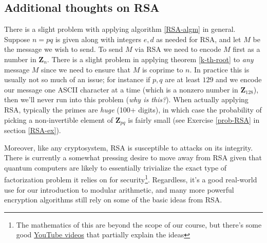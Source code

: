 \documentclass[12pt]{article}
\numberwithin{equation}{subsection}
\theoremstyle{note}
\begin{document}
\subsection{Additional thoughts on RSA}
There is a slight problem with applying algorithm \ref{RSA-algm} in general. Suppose $n=pq$ is given along with integers $e,d$ as needed for RSA, and let $M$ be the message we wish to send. To send $M$ via RSA we need to encode $M$ first as a number in $\mathbf{Z}_{n}$. There is a slight problem in applying theorem \ref{k-th-root} to \textit{any} message $M$ since we need to ensure that $M$ is coprime to $n$. In practice this is usually not so much of an issue; for instance if $p,q$ are at least $129$ and we encode our message one ASCII character at a time (which is a nonzero number in $\mathbf{Z}_{128}$), then we'll never run into this problem (\textit{why is this?}). When actually applying RSA, typically the primes are \textit{huge} (100+ digits), in which case the probability of picking a non-invertible element of $\mathbf{Z}_{pq}$ is fairly small (see Exercise \ref{prob-RSA} in section \ref{RSA-ex}).

Moreover, like any cryptosystem, RSA is susceptible to attacks on its integrity. There is currently a somewhat pressing desire to move away from RSA given that quantum computers are likely to essentially trivialize the exact type of factorization problem it relies on for security\footnote{The mathematics of this are beyond the scope of our course, but there's some good \href{https://youtu.be/-UrdExQW0cs?si=QaniK-f26fjQKmVA}{YouTube videos} that partially explain the ideas}. Regardless, it's a good real-world use for our introduction to modular arithmetic, and many more powerful encryption algorithms still rely on some of the basic ideas from RSA. 
\end{document}
